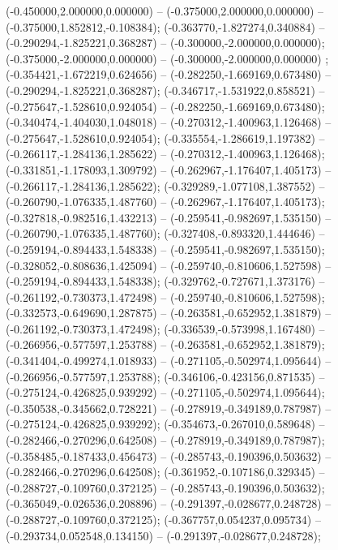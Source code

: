  (-0.450000,2.000000,0.000000) -- (-0.375000,2.000000,0.000000) -- (-0.375000,1.852812,-0.108384);
 (-0.363770,-1.827274,0.340884) -- (-0.290294,-1.825221,0.368287) -- (-0.300000,-2.000000,0.000000);
 (-0.375000,-2.000000,0.000000) -- (-0.300000,-2.000000,0.000000) ;
 (-0.354421,-1.672219,0.624656) -- (-0.282250,-1.669169,0.673480) -- (-0.290294,-1.825221,0.368287);
 (-0.346717,-1.531922,0.858521) -- (-0.275647,-1.528610,0.924054) -- (-0.282250,-1.669169,0.673480);
 (-0.340474,-1.404030,1.048018) -- (-0.270312,-1.400963,1.126468) -- (-0.275647,-1.528610,0.924054);
 (-0.335554,-1.286619,1.197382) -- (-0.266117,-1.284136,1.285622) -- (-0.270312,-1.400963,1.126468);
 (-0.331851,-1.178093,1.309792) -- (-0.262967,-1.176407,1.405173) -- (-0.266117,-1.284136,1.285622);
 (-0.329289,-1.077108,1.387552) -- (-0.260790,-1.076335,1.487760) -- (-0.262967,-1.176407,1.405173);
 (-0.327818,-0.982516,1.432213) -- (-0.259541,-0.982697,1.535150) -- (-0.260790,-1.076335,1.487760);
 (-0.327408,-0.893320,1.444646) -- (-0.259194,-0.894433,1.548338) -- (-0.259541,-0.982697,1.535150);
 (-0.328052,-0.808636,1.425094) -- (-0.259740,-0.810606,1.527598) -- (-0.259194,-0.894433,1.548338);
 (-0.329762,-0.727671,1.373176) -- (-0.261192,-0.730373,1.472498) -- (-0.259740,-0.810606,1.527598);
 (-0.332573,-0.649690,1.287875) -- (-0.263581,-0.652952,1.381879) -- (-0.261192,-0.730373,1.472498);
 (-0.336539,-0.573998,1.167480) -- (-0.266956,-0.577597,1.253788) -- (-0.263581,-0.652952,1.381879);
 (-0.341404,-0.499274,1.018933) -- (-0.271105,-0.502974,1.095644) -- (-0.266956,-0.577597,1.253788);
 (-0.346106,-0.423156,0.871535) -- (-0.275124,-0.426825,0.939292) -- (-0.271105,-0.502974,1.095644);
 (-0.350538,-0.345662,0.728221) -- (-0.278919,-0.349189,0.787987) -- (-0.275124,-0.426825,0.939292);
 (-0.354673,-0.267010,0.589648) -- (-0.282466,-0.270296,0.642508) -- (-0.278919,-0.349189,0.787987);
 (-0.358485,-0.187433,0.456473) -- (-0.285743,-0.190396,0.503632) -- (-0.282466,-0.270296,0.642508);
 (-0.361952,-0.107186,0.329345) -- (-0.288727,-0.109760,0.372125) -- (-0.285743,-0.190396,0.503632);
 (-0.365049,-0.026536,0.208896) -- (-0.291397,-0.028677,0.248728) -- (-0.288727,-0.109760,0.372125);
 (-0.367757,0.054237,0.095734) -- (-0.293734,0.052548,0.134150) -- (-0.291397,-0.028677,0.248728);
